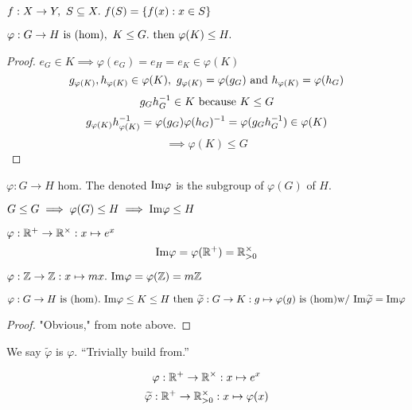 \documentclass[12pt]{article}
\newcommand\im{\TR{Im}}
\begin{document}
\bboxnota
\begin{nota}
    \(f:X\to Y,\ S\subseteq X.\ f(S)=\{f(x):x\in S\}\)
\end{nota}
\ebox

\newcommand\vphi{\varphi}
\bboxprop
\begin{prop}
    \(\vphi:G\to H\is\TM{hom},\ K\le G.\tthen \vphi(K)\le H.\)
\end{prop}
\ebox

\bboxproof
\begin{proof}
    \(e_G\in K\implies\vphi(e_G)=e_H=e_K\in\vphi(K)\)
    \[
        g_{\vphi(K)},h_{\vphi(K)}\in\vphi(K),\ g_{\vphi(K)}=\vphi(g_G)\nd h_{\vphi(K)}=\vphi(h_G)
    \]
    \[
        g_Gh^{-1}_G\in K\text{ because }K\le G
    \]
    \[
        g_{\vphi(K)}\inv h_{\vphi(K)}=\vphi(g_G)\vphi(h_G)^{-1}
        =\vphi(g_G\inv h_G)\in\vphi(K)
    \]
    \[
        \implies\vphi(K)\le G
    \]
\end{proof}
\ebox

\bboxdefn
\begin{defn}[Image]
    \(\vphi:G\to H\) hom. The  denoted \(\im\vphi\) is the subgroup
    of \(\vphi(G)\) of \(H\).
\end{defn}
\ebox
\bboxnote
\begin{note}
    \(G\le G\implies \vphi(G)\le H\implies\im\vphi\le H\)
\end{note}
\ebox


\bboxexam
\begin{exam}
    \(\vphi:\R^+\to\R^\times:x\mapsto e^x\)
    \[
        \im\vphi=\vphi(\R^+)=\R_{>0}^\times
    \]
\end{exam}
\ebox

\bboxexam
\begin{exam}
    \(\vphi:\Z\to\Z:x\mapsto mx.\ \im\vphi=\vphi(\Z)=m\Z\)
\end{exam}
\ebox

\bboxlem
\begin{lem}
    \(\vphi:G\to H\is\TM{hom}.\ \im\vphi\le K\le H\tthen\widetilde\vphi:G\to K
    :g\mapsto\vphi(g)\is\TM{hom}\T{w/ }\im\widetilde\vphi=\im\vphi\)
\end{lem}
\ebox

\bboxproof
\begin{proof}
    "Obvious," from note above.
\end{proof}
\ebox
We say \(\widetilde\vphi\) is \(\vphi\). ``Trivially build from.''

\bboxexam
\begin{exam}
    \[
        \vphi : \R^+ \to \R^\times      : x \mapsto e^x
    \]
    \[
        \widetilde
        \vphi : \R^+ \to \R^\times_{>0} : x \mapsto \vphi(x)
    \]
\end{exam}
\ebox
\end{document}
